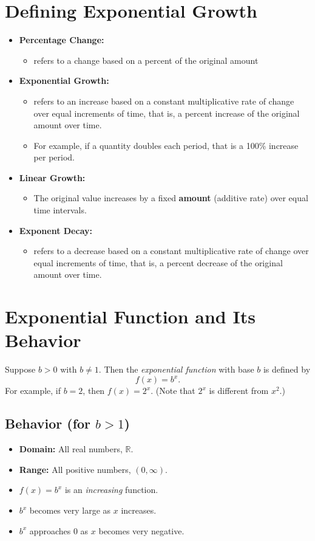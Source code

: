 \section{Defining Exponential Growth}
\begin{itemize}
  \item \textbf{Percentage Change:}
  \begin{itemize}
    \item refers to a change based on a percent of the original amount
  \end{itemize}
  \item \textbf{Exponential Growth:}
    \begin{itemize}
      \item refers to an increase based on a constant multiplicative rate of change over equal increments of time, that is, a percent increase of the original amount over time.
      \item For example, if a quantity doubles each period, that is a 100\% increase per period.
    \end{itemize}
  \item \textbf{Linear Growth:}
    \begin{itemize}
      \item The original value increases by a fixed \textbf{amount} (additive rate) over equal time intervals.
    \end{itemize}
    \item \textbf{Exponent Decay:}
    \begin{itemize}
      \item refers to a decrease based on a constant multiplicative rate of change over equal increments of time, that is, a percent decrease of the original amount over time.
    \end{itemize}
\end{itemize}

\section{Exponential Function and Its Behavior}
Suppose \(b>0\) with \(b\neq 1\). Then the \emph{exponential function} with base \(b\) is defined by
\[ f(x)=b^x. \]
For example, if \(b=2\), then \(f(x)=2^x\). (Note that \(2^x\) is different from \(x^2\).)

\subsection{Behavior (for \(b>1\))}
\begin{itemize}
  \item \textbf{Domain:} All real numbers, \(\mathbb{R}\).
  \item \textbf{Range:} All positive numbers, \((0,\infty)\).
  \item \(f(x)=b^x\) is an \emph{increasing} function.
  \item \(b^x\) becomes very large as \(x\) increases.
  \item \(b^x\) approaches \(0\) as \(x\) becomes very negative.
\end{itemize}

